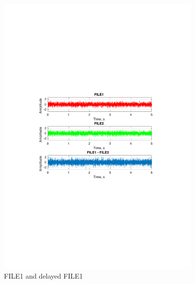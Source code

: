 \documentclass[12pt,a4paper,UKenglish]{article}
\begin{document}
 
\begin{figure} [H]
  \centering 
  \includegraphics[width=0.9\textwidth]{img/5d.pdf} 
  \caption{FILE1 and delayed FILE1}
  \label{white4} 
\end{figure}
\end{document}
